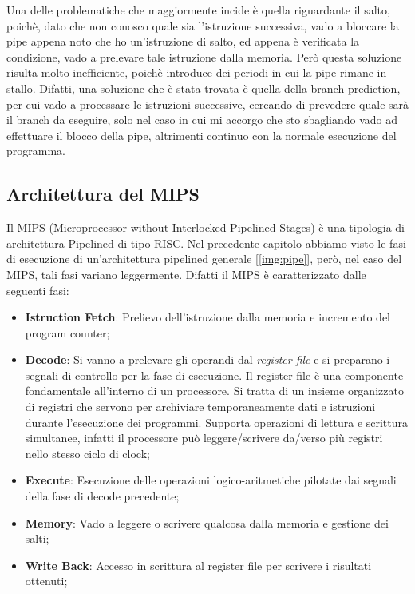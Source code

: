 Una delle problematiche che maggiormente incide è quella riguardante il salto, poichè, dato che non conosco quale sia l'istruzione successiva, vado a bloccare la pipe appena noto che ho un'istruzione di salto, ed appena è verificata la condizione, vado a prelevare tale istruzione dalla memoria. Però questa soluzione risulta molto inefficiente, poichè introduce dei periodi in cui la pipe rimane in stallo. Difatti, una soluzione che è stata trovata è quella della branch prediction, per cui vado a processare le istruzioni successive, cercando di prevedere quale sarà il branch da eseguire, solo nel caso in cui mi accorgo che sto sbagliando vado ad effettuare il blocco della pipe, altrimenti continuo con la normale esecuzione del programma.

\subsection{Architettura del MIPS}
Il MIPS (Microprocessor without Interlocked Pipelined Stages) è una tipologia di architettura Pipelined di tipo RISC.
Nel precedente capitolo abbiamo visto le fasi di esecuzione di un'architettura pipelined generale [\ref{img:pipe}], però, nel caso del MIPS, tali fasi variano leggermente. Difatti il MIPS è caratterizzato dalle seguenti fasi:
\begin{itemize}
    \item \textbf{Istruction Fetch}: Prelievo dell'istruzione dalla memoria e incremento del program counter;
    \item \textbf{Decode}: Si vanno a prelevare gli operandi dal \textit{register file} e si preparano i segnali di controllo per la fase di esecuzione. Il register file è una componente fondamentale all'interno di un processore. Si tratta di un insieme organizzato di registri che servono per archiviare temporaneamente dati e istruzioni durante l'esecuzione dei programmi. Supporta operazioni di lettura e scrittura simultanee, infatti il processore può leggere/scrivere da/verso più registri nello stesso ciclo di clock;
    \item \textbf{Execute}: Esecuzione delle operazioni logico-aritmetiche pilotate dai segnali della fase di decode precedente;
    \item \textbf{Memory}: Vado a leggere o scrivere qualcosa dalla memoria e gestione dei salti;
    \item \textbf{Write Back}: Accesso in scrittura al register file per scrivere i risultati ottenuti;
\end{itemize}

